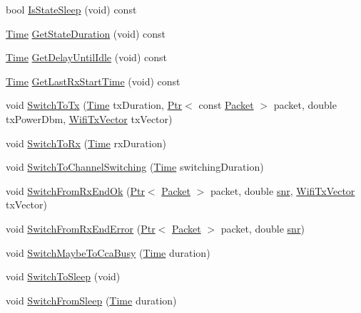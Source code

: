 \begin{DoxyCompactItemize}
\item 
bool \hyperlink{classns3_1_1WifiPhyStateHelper_ad9aa4dee680ddef1655ab5bd87d4d45a}{Is\+State\+Sleep} (void) const 
\item 
\hyperlink{classns3_1_1Time}{Time} \hyperlink{classns3_1_1WifiPhyStateHelper_a5acf9d2b6e611fca9e263f8c5414c947}{Get\+State\+Duration} (void) const 
\item 
\hyperlink{classns3_1_1Time}{Time} \hyperlink{classns3_1_1WifiPhyStateHelper_adc1c26ce9f4b25a4628eee695829d739}{Get\+Delay\+Until\+Idle} (void) const 
\item 
\hyperlink{classns3_1_1Time}{Time} \hyperlink{classns3_1_1WifiPhyStateHelper_afbbaeb14903e2f1e35a6a11809d76c23}{Get\+Last\+Rx\+Start\+Time} (void) const 
\item 
void \hyperlink{classns3_1_1WifiPhyStateHelper_a52483ec883b8a19de148abab5c8ecb62}{Switch\+To\+Tx} (\hyperlink{classns3_1_1Time}{Time} tx\+Duration, \hyperlink{classns3_1_1Ptr}{Ptr}$<$ const \hyperlink{classns3_1_1Packet}{Packet} $>$ packet, double tx\+Power\+Dbm, \hyperlink{classns3_1_1WifiTxVector}{Wifi\+Tx\+Vector} tx\+Vector)
\item 
void \hyperlink{classns3_1_1WifiPhyStateHelper_a0f2fc8bb8c61f94606b318bfc78b9003}{Switch\+To\+Rx} (\hyperlink{classns3_1_1Time}{Time} rx\+Duration)
\item 
void \hyperlink{classns3_1_1WifiPhyStateHelper_a4c14c3353b20a14934e20ece92bf411a}{Switch\+To\+Channel\+Switching} (\hyperlink{classns3_1_1Time}{Time} switching\+Duration)
\item 
void \hyperlink{classns3_1_1WifiPhyStateHelper_af0924cd0961ff240d929cf06e42b2f65}{Switch\+From\+Rx\+End\+Ok} (\hyperlink{classns3_1_1Ptr}{Ptr}$<$ \hyperlink{classns3_1_1Packet}{Packet} $>$ packet, double \hyperlink{lte__pathloss_8m_ae6e82a215dff6b79fb6e9952a1b78453}{snr}, \hyperlink{classns3_1_1WifiTxVector}{Wifi\+Tx\+Vector} tx\+Vector)
\item 
void \hyperlink{classns3_1_1WifiPhyStateHelper_a1a7ed444914c9669b886853589e71879}{Switch\+From\+Rx\+End\+Error} (\hyperlink{classns3_1_1Ptr}{Ptr}$<$ \hyperlink{classns3_1_1Packet}{Packet} $>$ packet, double \hyperlink{lte__pathloss_8m_ae6e82a215dff6b79fb6e9952a1b78453}{snr})
\item 
void \hyperlink{classns3_1_1WifiPhyStateHelper_ad9963e635d1ce21687f75a4908932be8}{Switch\+Maybe\+To\+Cca\+Busy} (\hyperlink{classns3_1_1Time}{Time} duration)
\item 
void \hyperlink{classns3_1_1WifiPhyStateHelper_adf92a7cf71fe546d59f10e8308a10df2}{Switch\+To\+Sleep} (void)
\item 
void \hyperlink{classns3_1_1WifiPhyStateHelper_adfa6b4ce47455491dbbd82a97b601cfb}{Switch\+From\+Sleep} (\hyperlink{classns3_1_1Time}{Time} duration)
\end{DoxyCompactItemize}
